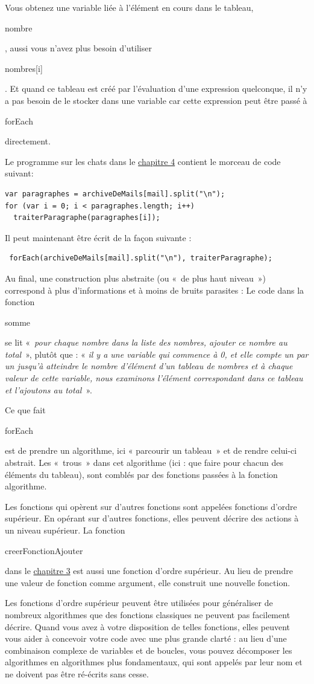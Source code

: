 \documentclass{FramateX}
\renewcommand{\texttt}[1]{\begin{sffamily}{#1}\end{sffamily}}
\begin{document}
Vous obtenez une variable liée à l'élément en cours dans le tableau,
\texttt{nombre}, aussi vous n'avez plus besoin d'utiliser
\texttt{nombres{[}i{]}}. Et quand ce tableau est créé par l'évaluation
d'une expression quelconque, il n'y a pas besoin de le stocker dans une
variable car cette expression peut être passé à \texttt{forEach}
directement.

Le programme sur les chats dans le \href{chapter4.html}{chapitre 4}
contient le morceau de code suivant:

\begin{lstlisting}
var paragraphes = archiveDeMails[mail].split("\n");
for (var i = 0; i < paragraphes.length; i++)
  traiterParagraphe(paragraphes[i]);
\end{lstlisting}
Il peut maintenant être écrit de la façon suivante :

\begin{lstlisting}
 forEach(archiveDeMails[mail].split("\n"), traiterParagraphe);
\end{lstlisting}
Au final, une construction plus abstraite (ou «~de plus haut niveau~»)
correspond à plus d'informations et à moins de bruits parasites : Le
code dans la fonction \texttt{somme} se lit «~\emph{pour chaque nombre
dans la liste des nombres, ajouter ce nombre au total}~», plutôt que : «
\emph{il y a une variable qui commence à 0, et elle compte un par un
jusqu'à atteindre le nombre d'élément d'un tableau de nombres et à
chaque valeur de cette variable, nous examinons l'élément correspondant
dans ce tableau et l'ajoutons au total}~».

\begin{center}\end{center}

Ce que fait \texttt{forEach} est de prendre un algorithme, ici «
parcourir un tableau~» et de rendre celui-ci abstrait. Les «~trous~»
dans cet algorithme (ici : que faire pour chacun des éléments du
tableau), sont comblés par des fonctions passées à la fonction
algorithme.

Les fonctions qui opèrent sur d'autres fonctions sont appelées fonctions
d'ordre supérieur. En opérant sur d'autres fonctions, elles peuvent
décrire des actions à un niveau supérieur. La fonction
\texttt{creerFonctionAjouter} dans le \href{chapter3.html}{chapitre 3}
est aussi une fonction d'ordre supérieur. Au lieu de prendre une valeur
de fonction comme argument, elle construit une nouvelle fonction.

Les fonctions d'ordre supérieur peuvent être utilisées pour généraliser
de nombreux algorithmes que des fonctions classiques ne peuvent pas
facilement décrire. Quand vous avez à votre disposition de telles
fonctions, elles peuvent vous aider à concevoir votre code avec une plus
grande clarté : au lieu d'une combinaison complexe de variables et de
boucles, vous pouvez décomposer les algorithmes en algorithmes plus
fondamentaux, qui sont appelés par leur nom et ne doivent pas être
ré-écrits sans cesse.
\end{document}
